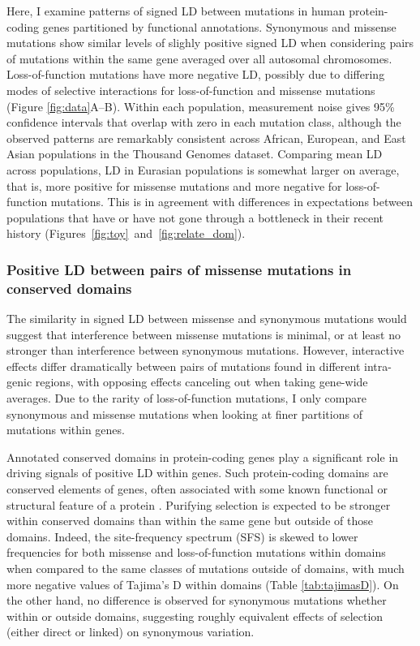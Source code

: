 \documentclass[]{article}
\begin{document}
Here, I examine patterns of signed LD between mutations in human protein-coding
genes partitioned by functional annotations. Synonymous and missense mutations
show similar levels of slighly positive signed LD when considering pairs of
mutations within the same gene averaged over all autosomal chromosomes.
Loss-of-function mutations have more negative LD, possibly due to differing
modes of selective interactions for loss-of-function and missense mutations
(Figure \ref{fig:data}A--B). Within each population, measurement noise gives
95\% confidence intervals that overlap with zero in each mutation class,
although the observed patterns are remarkably consistent across African,
European, and East Asian populations in the Thousand Genomes dataset. Comparing
mean LD across populations, LD in Eurasian populations is somewhat larger on
average, that is, more positive for missense mutations and more negative for
loss-of-function mutations. This is in agreement with differences in
expectations between populations that have or have not gone through a
bottleneck in their recent history
(Figures~\ref{fig:toy}~and~\ref{fig:relate_dom}).

\subsubsection{Positive LD between pairs of missense mutations in conserved domains}

The similarity in signed LD between missense and synonymous mutations would
suggest that interference between missense mutations is minimal, or at least no
stronger than interference between synonymous mutations. However, interactive
effects differ dramatically between pairs of mutations found in different
intra-genic regions, with opposing effects canceling out when taking gene-wide
averages. Due to the rarity of loss-of-function mutations, I only compare
synonymous and missense mutations when looking at finer partitions of mutations
within genes.

Annotated conserved domains in protein-coding genes play a significant role in
driving signals of positive LD within genes. Such protein-coding domains are
conserved elements of genes, often associated with some known functional or
structural feature of a protein \citep{Stanek2020-pa}. Purifying selection is
expected to be stronger within conserved domains than within the same gene but
outside of those domains. Indeed, the site-frequency spectrum (SFS) is skewed
to lower frequencies for both missense and loss-of-function mutations within
domains when compared to the same classes of mutations outside of domains, with
much more negative values of Tajima's D within domains (Table
\ref{tab:tajimasD}). On the other hand, no difference is observed for
synonymous mutations whether within or outside domains, suggesting roughly
equivalent effects of selection (either direct or linked) on synonymous
variation.
\end{document}
